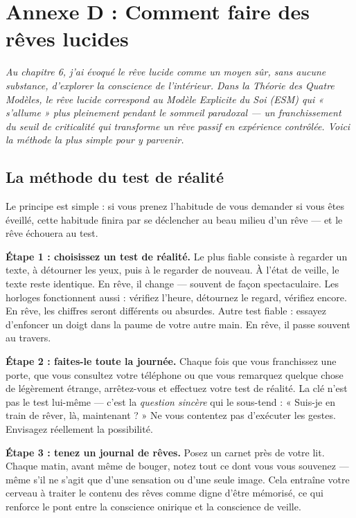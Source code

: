 \documentclass[11pt, twoside, openright]{book}
\begin{document}
\chapter*{Annexe D : Comment faire des rêves lucides}

\textit{Au chapitre 6, j'ai évoqué le rêve lucide comme un moyen sûr, sans aucune substance, d'explorer la conscience de l'intérieur. Dans la Théorie des Quatre Modèles, le rêve lucide correspond au Modèle Explicite du Soi (ESM) qui « s'allume » plus pleinement pendant le sommeil paradoxal --- un franchissement du seuil de criticalité qui transforme un rêve passif en expérience contrôlée. Voici la méthode la plus simple pour y parvenir.}

\section*{La méthode du test de réalité}

Le principe est simple : si vous prenez l'habitude de vous demander si vous êtes éveillé, cette habitude finira par se déclencher au beau milieu d'un rêve --- et le rêve échouera au test.

\textbf{Étape 1 : choisissez un test de réalité.} Le plus fiable consiste à regarder un texte, à détourner les yeux, puis à le regarder de nouveau. À l'état de veille, le texte reste identique. En rêve, il change --- souvent de façon spectaculaire. Les horloges fonctionnent aussi : vérifiez l'heure, détournez le regard, vérifiez encore. En rêve, les chiffres seront différents ou absurdes. Autre test fiable : essayez d'enfoncer un doigt dans la paume de votre autre main. En rêve, il passe souvent au travers.

\textbf{Étape 2 : faites-le toute la journée.} Chaque fois que vous franchissez une porte, que vous consultez votre téléphone ou que vous remarquez quelque chose de légèrement étrange, arrêtez-vous et effectuez votre test de réalité. La clé n'est pas le test lui-même --- c'est la \textit{question sincère} qui le sous-tend : « Suis-je en train de rêver, là, maintenant ? » Ne vous contentez pas d'exécuter les gestes. Envisagez réellement la possibilité.

\textbf{Étape 3 : tenez un journal de rêves.} Posez un carnet près de votre lit. Chaque matin, avant même de bouger, notez tout ce dont vous vous souvenez --- même s'il ne s'agit que d'une sensation ou d'une seule image. Cela entraîne votre cerveau à traiter le contenu des rêves comme digne d'être mémorisé, ce qui renforce le pont entre la conscience onirique et la conscience de veille.
\end{document}
